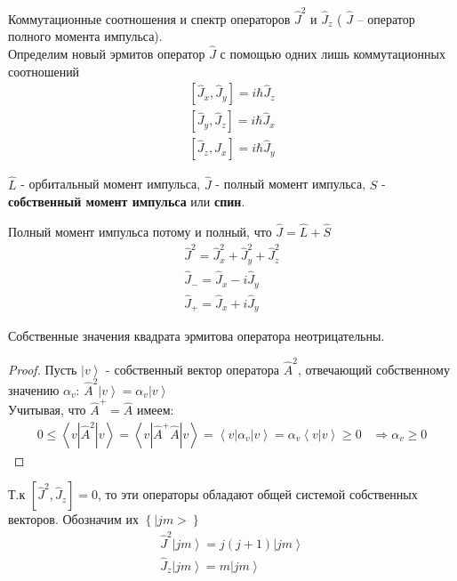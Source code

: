 \documentclass[__main__.tex]{subfiles}
\begin{document}
Коммутационные соотношения и спектр операторов $\hat{J}^2$ и $\hat{J}_z$ ( $\hat{J}$ -- оператор полного момента импульса).\\

Определим новый эрмитов оператор $\hat{J}$ с помощью одних лишь коммутационных соотношений
\begin{gather*}
    \left[\hat{J}_x,\hat{J}_y\right] = i\hbar\hat{J}_z\\
    \left[\hat{J}_y,\hat{J}_z\right] = i\hbar\hat{J}_x\\
    \left[\hat{J}_z,\hat{J}_x\right] = i\hbar\hat{J}_y
\end{gather*}
\begin{definition}
    $\hat{L}$ -  орбитальный момент импульса, $\hat{J}$ - полный момент импульса, $\hat{S}$ - \textbf{собственный момент импульса} или \textbf{спин}.
\end{definition}
Полный момент импульса потому и полный, что $\hat{J} = \hat{L}+\hat{S}$
\begin{gather*}
    \hat{J}^2 = \hat{J}^2_x+\hat{J}^2_y+\hat{J}^2_z\\
    \hat{J}_{-} = \hat{J}_x-i\hat{J}_y\\
    \hat{J}_{+} = \hat{J}_x+i\hat{J}_y
\end{gather*}
\begin{theorem}
    Собственные значения квадрата эрмитова оператора неотрицательны.
\end{theorem}
\begin{proof}
    Пусть $\left|v\right>$ - собственный вектор оператора $\hat{A}^2$, отвечающий собственному значению $\alpha_v$: $\hat{A}^2\left|v\right> = \alpha_v\left|v\right>$\\
    Учитывая, что $\hat{A}^{+} = \hat{A}$ имеем:
    \begin{gather*}
        0 \leq \left<v|\hat{A}^2|v\right> = \left<v|\hat{A}^{+}\hat{A}|v\right> = \left<v|\alpha_v|v\right> = \alpha_v\left<v|v\right> \geq 0\;\;\;\Rightarrow \alpha_v \geq 0
    \end{gather*}
\end{proof}
Т.к $\left[\hat{J}^2,\hat{J}_z\right] = 0$, то эти операторы обладают общей системой собственных векторов. Обозначим их $\left\{|jm>\right\}$
\begin{gather*}
    \hat{J}^2\left|jm\right> = j(j+1)\left|jm\right>\\
    \hat{J}_z\left|jm\right> = m\left|jm\right>
\end{gather*}
\end{document}
